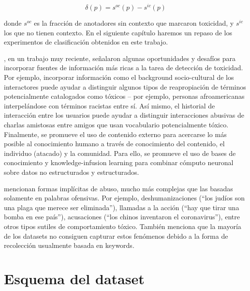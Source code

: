 \begin{equation}
    \delta(p) = s^{oc}(p) - s^{ic}(p)
\end{equation}

\noindent donde $s^{oc}$ es la fracción de anotadores sin contexto que marcaron toxicidad, y $s^{ic}$ los que no tienen contexto. En el siguiente capítulo haremos un repaso de los experimentos de clasificación obtenidos en este trabajo.

\citet{sheth2021defining}, en un trabajo muy reciente, señalaron algunas oportunidades y desafíos para incorporar fuentes de información más ricas a la tarea de detección de toxicidad. Por ejemplo, incorporar información como el background socio-cultural de los interactores puede ayudar a distinguir algunos tipos de reapropiación de términos potencialmente catalogados como tóxicos -- por ejemplo, personas afroamericanas interpelándose con términos racistas entre sí. Así mismo, el historial de interacción entre los usuarios puede ayudar a distinguir interacciones abusivas de charlas amistosas entre amigos que usan vocabulario potencialmente tóxico. Finalmente, se promueve el uso de contenido externo para acercarse lo más posible al conocimiento humano a través de conocimiento del contenido, el individuo (atacado) y la comunidad. Para ello, se promueve el uso de bases de conocimiento y knowledge-infusion learning \cite{gaur2020infusion} para combinar cómputo neuronal sobre datos no estructurados y estructurados.



\citet{wiegand2021implicitly} mencionan formas implícitas de abuso, mucho más complejas que las basadas solamente en palabras ofensivas. Por ejemplo, deshumanizaciones (``los judíos son una plaga que merece ser eliminada''), llamadas a la acción (``hay que tirar una bomba en ese país''), acusaciones (``los chinos inventaron el coronavirus''), entre otros tipos sutiles de comportamiento tóxico. También menciona que la mayoría de los datasets no consiguen capturar estos fenómenos debido a la forma de recolección usualmente basada en keywords.

\section{Esquema del dataset}




